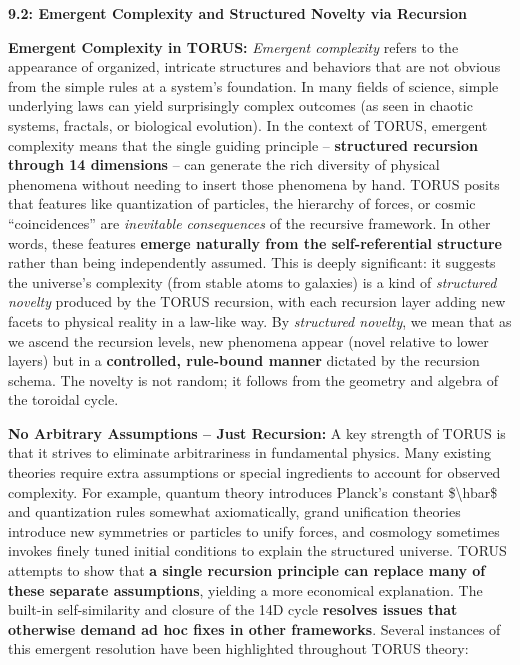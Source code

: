 \textbf{9.2: Emergent Complexity and Structured Novelty via Recursion}

\textbf{Emergent Complexity in TORUS:} \emph{Emergent complexity} refers
to the appearance of organized, intricate structures and behaviors that
are not obvious from the simple rules at a system's foundation. In many
fields of science, simple underlying laws can yield surprisingly complex
outcomes (as seen in chaotic systems, fractals, or biological
evolution). In the context of TORUS, emergent complexity means that the
single guiding principle -- \textbf{structured recursion through 14
dimensions} -- can generate the rich diversity of physical phenomena
without needing to insert those phenomena by hand. TORUS posits that
features like quantization of particles, the hierarchy of forces, or
cosmic ``coincidences'' are \emph{inevitable consequences} of the
recursive framework. In other words, these features \textbf{emerge
naturally from the self-referential structure} rather than being
independently assumed. This is deeply significant: it suggests the
universe's complexity (from stable atoms to galaxies) is a kind of
\emph{structured novelty} produced by the TORUS recursion, with each
recursion layer adding new facets to physical reality in a law-like way.
By \emph{structured novelty}, we mean that as we ascend the recursion
levels, new phenomena appear (novel relative to lower layers) but in a
\textbf{controlled, rule-bound manner} dictated by the recursion schema.
The novelty is not random; it follows from the geometry and algebra of
the toroidal cycle.

\textbf{No Arbitrary Assumptions -- Just Recursion:} A key strength of
TORUS is that it strives to eliminate arbitrariness in fundamental
physics. Many existing theories require extra assumptions or special
ingredients to account for observed complexity. For example, quantum
theory introduces Planck's constant \$\textbackslash{}hbar\$ and
quantization rules somewhat axiomatically, grand unification theories
introduce new symmetries or particles to unify forces, and cosmology
sometimes invokes finely tuned initial conditions to explain the
structured universe. TORUS attempts to show that \textbf{a single
recursion principle can replace many of these separate assumptions},
yielding a more economical explanation. The built-in self-similarity and
closure of the 14D cycle \textbf{resolves issues that otherwise demand
ad hoc fixes in other frameworks​}. Several instances of this emergent
resolution have been highlighted throughout TORUS theory:

